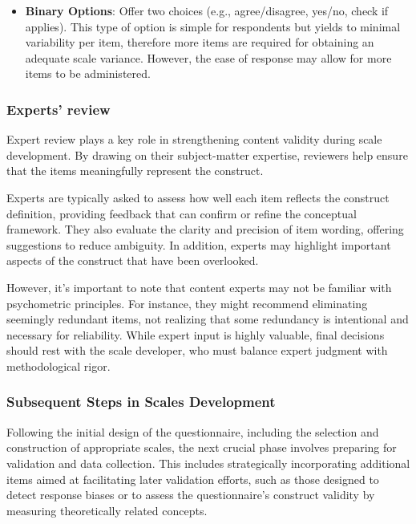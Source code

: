 \documentclass[
  letterpaper,
  DIV=11,
  numbers=noendperiod]{scrartcl}
\providecommand{\tightlist}{%
  \setlength{\itemsep}{0pt}\setlength{\parskip}{0pt}}\usepackage{longtable,booktabs,array}
\begin{document}
\begin{itemize}
\tightlist
\item
  \textbf{Binary Options}: Offer two choices (e.g., agree/disagree,
  yes/no, check if applies). This type of option is simple for
  respondents but yields to minimal variability per item, therefore more
  items are required for obtaining an adequate scale variance. However,
  the ease of response may allow for more items to be administered.
\end{itemize}

\hypertarget{experts-review}{%
\subsubsection*{Experts' review}\label{experts-review}}

Expert review plays a key role in strengthening content validity during
scale development. By drawing on their subject-matter expertise,
reviewers help ensure that the items meaningfully represent the
construct.

Experts are typically asked to assess how well each item reflects the
construct definition, providing feedback that can confirm or refine the
conceptual framework. They also evaluate the clarity and precision of
item wording, offering suggestions to reduce ambiguity. In addition,
experts may highlight important aspects of the construct that have been
overlooked.

However, it's important to note that content experts may not be familiar
with psychometric principles. For instance, they might recommend
eliminating seemingly redundant items, not realizing that some
redundancy is intentional and necessary for reliability. While expert
input is highly valuable, final decisions should rest with the scale
developer, who must balance expert judgment with methodological rigor.

\hypertarget{subsequent-steps-in-scales-development}{%
\subsubsection*{Subsequent Steps in Scales
Development}\label{subsequent-steps-in-scales-development}}

Following the initial design of the questionnaire, including the
selection and construction of appropriate scales, the next crucial phase
involves preparing for validation and data collection. This includes
strategically incorporating additional items aimed at facilitating later
validation efforts, such as those designed to detect response biases or
to assess the questionnaire's construct validity by measuring
theoretically related concepts.
\end{document}
